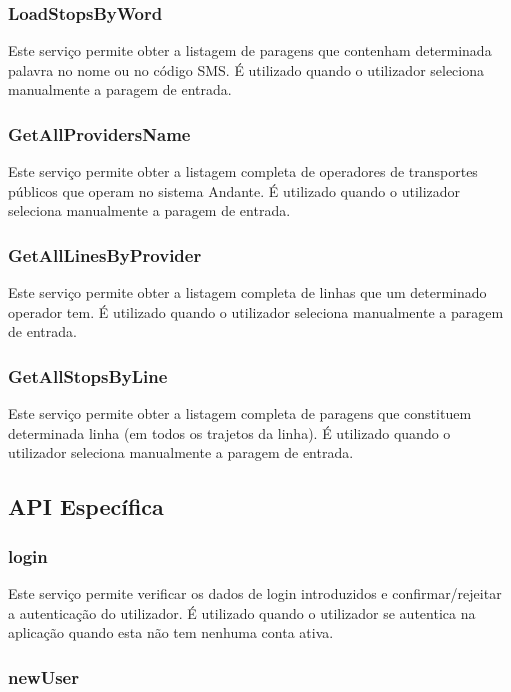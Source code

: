 \subsubsection{LoadStopsByWord}

Este serviço permite obter a listagem de paragens que contenham determinada palavra no nome ou no código SMS. É utilizado quando o utilizador seleciona manualmente a paragem de entrada.

\subsubsection{GetAllProvidersName}

Este serviço permite obter a listagem completa de operadores de transportes públicos que operam no sistema Andante. É utilizado quando o utilizador seleciona manualmente a paragem de entrada.

\subsubsection{GetAllLinesByProvider}

Este serviço permite obter a listagem completa de linhas que um determinado operador tem. É utilizado quando o utilizador seleciona manualmente a paragem de entrada.

\subsubsection{GetAllStopsByLine}

Este serviço permite obter a listagem completa de paragens que constituem determinada linha (em todos os trajetos da linha). É utilizado quando o utilizador seleciona manualmente a paragem de entrada.

\subsection{API Específica}

\subsubsection{login}

Este serviço permite verificar os dados de login introduzidos e confirmar/rejeitar a autenticação do utilizador. É utilizado quando o utilizador se autentica na aplicação quando esta não tem nenhuma conta ativa.

\subsubsection{newUser}

